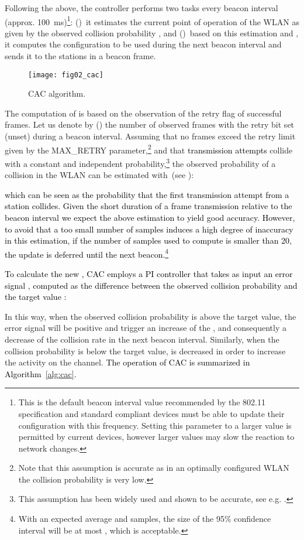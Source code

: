 \documentclass[a4paper,10pt]{article}
\newcommand{\revs}[1]{\textcolor{black}{#1}}
\begin{document}
Following the above, the controller performs two tasks every beacon interval (approx. 100~ms)\revs{\footnote{This is the default beacon interval value recommended by the 802.11 specification and standard compliant devices must be able to update their configuration with this frequency. Setting this parameter to a larger value is permitted by current devices, however larger values may slow the reaction to network changes.}}: ()~it estimates the current point of operation of the WLAN as given by the observed collision probability , and ()~based on this estimation and , it computes the  configuration to be used during the next beacon interval and sends it to the stations in a beacon frame.

\begin{figure}
\centerline{\texttt{[image: fig02\_cac]}}
\caption{CAC algorithm.}
\label{fig:cac}
\end{figure}

The computation of  is based on the observation of the retry flag of successful frames. Let us denote by  () the number of observed frames with the retry bit set (unset) during a beacon interval. Assuming that no frames exceed the retry limit given by the {\ttfamily MAX\_RETRY} parameter,\footnote{Note that this assumption is accurate as in an optimally configured WLAN the collision probability is very low.} and that \revs{transmission attempts} collide with a constant and independent probability,\footnote{This assumption has been widely used and shown to be accurate, see e.g. \cite{bianchi00}.} the observed probability of a collision in the WLAN can be estimated with~(see \cite{patras09monet}):

\revs{which can be seen as the probability that the first transmission attempt from a station collides. Given the short duration of a frame transmission relative to the beacon interval we expect the above estimation to yield good accuracy. However, to avoid that a too small number of samples induces a high degree of inaccuracy in this estimation, if the number of samples used to compute  is smaller than 20, the update is  deferred until the next beacon.\footnote{With an expected average  and  samples, the size of the 95\% confidence interval will be at most , which is acceptable.}}

\revs{To calculate the new , CAC employs a PI controller that takes as input an error signal , computed as the difference between the observed collision probability  and the target value :}


In this way, when the observed collision probability is above the target value, the error signal will be positive and trigger an increase of the , and consequently a decrease of the collision rate in the next beacon interval. Similarly, when the collision probability is below the target value,  is decreased in order to increase the activity on the channel. \revs{The operation of CAC is summarized in Algorithm~\ref{alg:cac}.}
\end{document}
